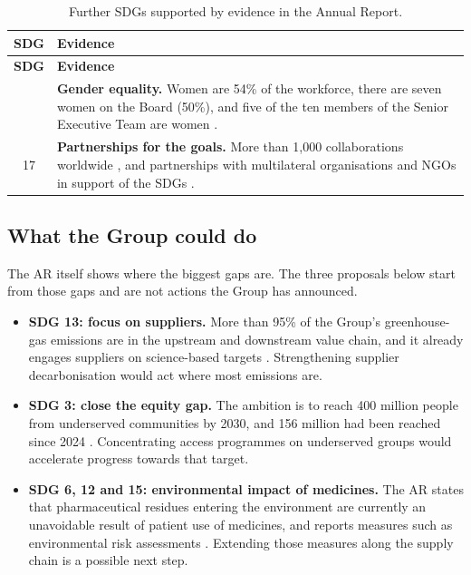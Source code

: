 \begin{xltabular}{\linewidth}{@{}cY@{}}
\caption{Further SDGs supported by evidence in the Annual Report.}\label{tab:ods-adicionais}\\*
\toprule
\textbf{SDG} & \textbf{Evidence} \\*
\midrule
\endfirsthead
\toprule
\textbf{SDG} & \textbf{Evidence} \\*
\midrule
\endhead
\bottomrule
{} & \textbf{Gender equality.} Women are 54\% of the workforce, there are seven women on the Board (50\%), and five of the ten members of the Senior Executive Team are women \cite[p.~39]{AR}. \\
17 & \textbf{Partnerships for the goals.} More than 1,000 collaborations worldwide \cite[p.~37]{AR}, and partnerships with multilateral organisations and NGOs in support of the SDGs \cite[p.~76]{AR}. \\
\end{xltabular}

\subsection{What the Group could do}

The AR itself shows where the biggest gaps are. The three proposals below start from those gaps and are not actions the Group has announced.

\begin{analysis}
\begin{itemize}[leftmargin=*,nosep]
\item \textbf{SDG 13: focus on suppliers.} More than 95\% of the Group's greenhouse-gas emissions are in the upstream and downstream value chain, and it already engages suppliers on science-based targets \cite[p.~42]{AR}. Strengthening supplier decarbonisation would act where most emissions are.
\item \textbf{SDG 3: close the equity gap.} The ambition is to reach 400 million people from underserved communities by 2030, and 156 million had been reached since 2024 \cite[pp.~5, 41]{AR}. Concentrating access programmes on underserved groups would accelerate progress towards that target.
\item \textbf{SDG 6, 12 and 15: environmental impact of medicines.} The AR states that pharmaceutical residues entering the environment are currently an unavoidable result of patient use of medicines, and reports measures such as environmental risk assessments \cite[p.~45]{AR}. Extending those measures along the supply chain is a possible next step.
\end{itemize}
\end{analysis}

